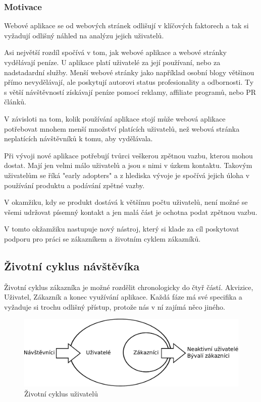 \documentclass[bc,male,java,dept456]{diploma}						%
\begin{document}
\subsubsection{Motivace}

Webové aplikace se od webových stránek odlišují v klíčových faktorech a tak si vyžadují odlišný náhled na analýzu jejich uživatelů. 

Asi největší rozdíl spočívá v tom, jak webové aplikace a webové stránky vydělávají peníze. U aplikace platí uživatelé za její používaní, nebo za nadstadardní služby. Menší webové stránky jako například osobní blogy většinou přímo nevydělávají, ale poskytují autorovi status profesionality a odbornosti. Ty s větší návštěvností získávají peníze pomocí reklamy, affiliate programů, nebo PR článků.

V závisloti na tom, kolik používání aplikace stojí může webová aplikace potřebovat mnohem menší množství platících uživatelů, než webová stránka neplatících návštěvníků k tomu, aby vydělávala. 

Při vývoji nové aplikace potřebují tvůrci veškerou zpětnou vazbu, kterou mohou dostat. Mají jen velmi málo uživatelů a jsou s nimi v úzkem kontaktu. Takovým uživatelům se říká "early adopters" a z hlediska vývoje je spočívá jejich úloha v používání produktu a podávání zpětné vazby. 

V okamžiku, kdy se produkt dostává k většímu počtu uživatelů, není možné se všemi udržovat písemný kontakt a jen malá část je ochotna podat zpětnou vazbu. 

V tomto okžamžiku nastupuje nový nástroj, který si klade za cíl poskytovat podporu pro práci se zákazníkem a životním cyklem zákazníků.


\subsection{Životní cyklus návštěvíka} %

Životní cyklus zákazníka je možné rozdělit chronologicky do čtyř částí. Akvizice, Uživatel, Zákazník a konec využívání aplikace. Každá fáze má své specifika a vyžaduje si trochu odlišný přístup, protože nás v ní zajímá něco jiného.

\begin{figure}[h]
	\centering
	\includegraphics[width=14cm]{img/user_lifecycle_slim.pdf}
	\caption{Životní cyklus uživatelů}
	\label{lifecycle}
\end{figure}
\end{document}
